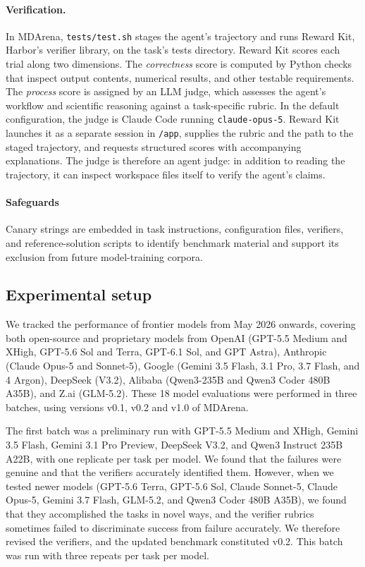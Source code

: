 \paragraph{Verification.}
In MDArena, \texttt{tests/test.sh} stages the agent's trajectory and runs Reward Kit, Harbor's
verifier library, on the task's tests directory. Reward Kit scores each trial along two dimensions. The
\emph{correctness} score is computed by Python checks that inspect output
contents, numerical results, and other testable requirements. The \emph{process} score is assigned by an LLM judge, which assesses the agent's workflow and scientific reasoning against a task-specific rubric. In the default configuration, the judge is Claude Code running \texttt{claude-opus-5}. Reward Kit launches it as a separate session in \texttt{/app}, supplies the rubric and the path to the staged trajectory, and requests structured scores with accompanying explanations. The judge is therefore an agent judge: in addition to reading the trajectory, it can inspect workspace files itself to verify the agent's claims. 
\paragraph{Safeguards}
Canary strings are embedded in task instructions, configuration
files, verifiers, and reference-solution scripts to identify benchmark material
and support its exclusion from future model-training corpora. 

 


\subsection{Experimental setup}

We tracked the performance of frontier models from May 2026 onwards, covering both open-source and proprietary models from OpenAI (GPT-5.5 Medium and XHigh, GPT-5.6 Sol and Terra, GPT-6.1 Sol, and GPT Astra), Anthropic (Claude Opus-5 and Sonnet-5), Google (Gemini 3.5 Flash, 3.1 Pro, 3.7 Flash, and 4 Argon), DeepSeek (V3.2), Alibaba (Qwen3-235B and Qwen3 Coder 480B A35B), and Z.ai (GLM-5.2). These 18 model evaluations were performed in three batches, using versions v0.1, v0.2 and v1.0 of MDArena.

The first batch was a preliminary run with GPT-5.5 Medium and XHigh, Gemini 3.5 Flash, Gemini 3.1 Pro Preview, DeepSeek V3.2, and Qwen3 Instruct 235B A22B, with one replicate per task per model. We found that the failures were genuine and that the verifiers accurately identified them. However, when we tested newer models (GPT-5.6 Terra, GPT-5.6 Sol, Claude Sonnet-5, Claude Opus-5, Gemini 3.7 Flash, GLM-5.2, and Qwen3 Coder 480B A35B), we found that they accomplished the tasks in novel ways, and the verifier rubrics sometimes failed to discriminate success from failure accurately. We therefore revised the verifiers, and the updated benchmark constituted v0.2. This batch was run with three repeats per task per model.

